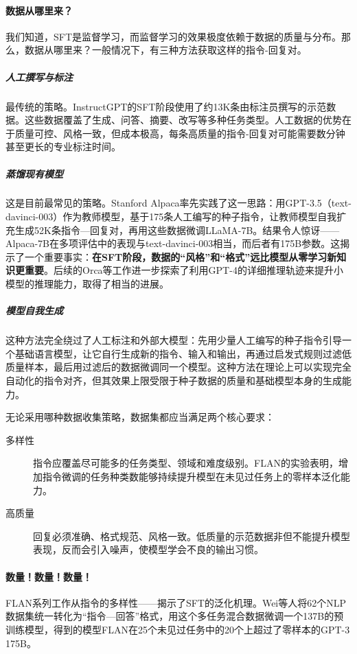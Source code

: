 \paragraph{数据从哪里来？}

我们知道，SFT是监督学习，而监督学习的效果极度依赖于数据的质量与分布。那么，数据从哪里来？一般情况下，有三种方法获取这样的指令-回复对。

\subparagraph{人工撰写与标注} 最传统的策略。InstructGPT的SFT阶段使用了约13K条由标注员撰写的示范数据\cite{ouyang2022traininglanguagemodelsfollow}。这些数据覆盖了生成、问答、摘要、改写等多种任务类型。人工数据的优势在于质量可控、风格一致，但成本极高，每条高质量的指令-回复对可能需要数分钟甚至更长的专业标注时间。

\subparagraph{蒸馏现有模型} 这是目前最常见的策略。Stanford Alpaca率先实践了这一思路：用GPT-3.5（text-davinci-003）作为教师模型，基于175条人工编写的种子指令，让教师模型自我扩充生成52K条指令—回复对，再用这些数据微调LLaMA-7B\cite{taori2023alpaca}。结果令人惊讶——Alpaca-7B在多项评估中的表现与text-davinci-003相当，而后者有175B参数。这揭示了一个重要事实：\textbf{在SFT阶段，数据的“风格”和“格式”远比模型从零学习新知识更重要}。后续的Orca等工作进一步探索了利用GPT-4的详细推理轨迹来提升小模型的推理能力\cite{mukherjee2023orca}，取得了相当的进展。

\subparagraph{模型自我生成} 这种方法完全绕过了人工标注和外部大模型：先用少量人工编写的种子指令引导一个基础语言模型，让它自行生成新的指令、输入和输出，再通过启发式规则过滤低质量样本，最后用过滤后的数据微调同一个模型\cite{wang2023selfinstruct}。这种方法在理论上可以实现完全自动化的指令对齐，但其效果上限受限于种子数据的质量和基础模型本身的生成能力。

无论采用哪种数据收集策略，数据集都应当满足两个核心要求：
\begin{description}
    \item[多样性] 指令应覆盖尽可能多的任务类型、领域和难度级别。FLAN的实验表明，增加指令微调的任务种类数能够持续提升模型在未见过任务上的零样本泛化能力\cite{wei2022finetunedlanguagemodelszeroshot}。
    \item[高质量] 回复必须准确、格式规范、风格一致。低质量的示范数据非但不能提升模型表现，反而会引入噪声，使模型学会不良的输出习惯。
\end{description}

\paragraph{数量！数量！数量！}

FLAN系列工作从指令的多样性——揭示了SFT的泛化机理。Wei等人将62个NLP数据集统一转化为“指令—回答”格式，用这个多任务混合数据微调一个137B的预训练模型，得到的模型FLAN在25个未见过任务中的20个上超过了零样本的GPT-3 175B\cite{wei2022finetunedlanguagemodelszeroshot}。

